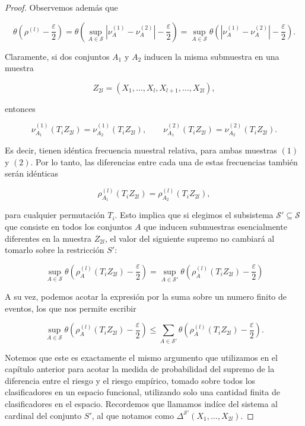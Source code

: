 \documentclass{report}
\begin{document}
\begin{proof}
Observemos además que

\[
\theta \left( \rho^{(l)} - \frac{\varepsilon}{2} \right) = \theta \left( \sup_{A \in \mathcal{S}} \left| \nu^{(1)}_A - \nu^{(2)}_A \right| -
 \frac{\varepsilon}{2} \right) = \sup_{A \in \mathcal{S}} \theta \left( \left| \nu^{(1)}_A - \nu^{(2)}_A \right| - \frac{\varepsilon}{2} \right).
\]

Claramente, si dos conjuntos \( A_1 \) y \( A_2 \) inducen la misma submuestra en una muestra 

\[
Z_{2l} = (X_1, \dots, X_l, X_{l+1}, \dots, X_{2l}),
\]

entonces

\[
\nu^{(1)}_{A_1}(T_i Z_{2l}) = \nu^{(1)}_{A_2}(T_i Z_{2l}), \qquad \nu^{(2)}_{A_1}(T_i Z_{2l}) = \nu^{(2)}_{A_2}(T_i Z_{2l}).
\]

Es decir, tienen idéntica frecuencia muestral relativa, para ambas muestras $(1)$ y $(2)$. Por lo tanto, las diferencias entre cada una de estas frecuencias también serán idénticas

\[
\rho^{(l)}_{A_1}(T_i Z_{2l}) = \rho^{(l)}_{A_2}(T_i Z_{2l}),
\]

para cualquier permutación \( T_i \). Esto implica que si elegimos el subsistema \( \mathcal{S}' \subseteq \mathcal{S} \)
 que consiste en todos los conjuntos \( A \) que inducen submuestras esencialmente diferentes en la muestra \( Z_{2l} \),
el valor del siguiente supremo no cambiará al tomarlo sobre la restricción $S'$:

\[
\sup_{A \in \mathcal{S}} \theta \left( \rho^{(l)}_A(T_i Z_{2l}) - \frac{\varepsilon}{2} \right) = 
\sup_{A \in \mathcal{S}'} \theta \left( \rho^{(l)}_A(T_i Z_{2l}) - \frac{\varepsilon}{2} \right) 
\]

A su vez, podemos acotar la expresión por la suma sobre un numero finito de eventos, los que nos permite escribir

\[
\sup_{A \in \mathcal{S}} \theta \left( \rho^{(l)}_A(T_i Z_{2l}) - \frac{\varepsilon}{2} \right)
\leq \sum_{A \in \mathcal{S}'} \theta \left( \rho^{(l)}_A(T_i Z_{2l}) - \frac{\varepsilon}{2} \right).
\]

Notemos que este es exactamente el mismo argumento que utilizamos en el capítulo anterior para acotar la medida de probabilidad del supremo de la diferencia
entre el riesgo y el riesgo empírico, tomado sobre todos los clasificadores en un espacio funcional, utilizando solo una cantidad finita de clasificadores en el espacio.
Recordemos que llamamos indíce del sistema al cardinal del conjunto $S'$, al que notamos como $ \Delta^{\mathcal{S'}}(X_1, \dots, X_{2l})$.\newline


\end{proof}
\end{document}
